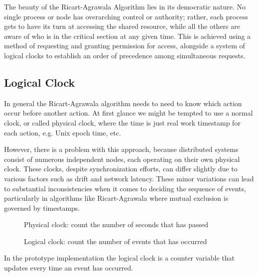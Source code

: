 The beauty of the Ricart-Agrawala Algorithm lies in its democratic nature. No 
single process or node has overarching control or authority; rather, each process 
gets to have its turn at accessing the shared resource, while all the others are 
aware of who is in the critical section at any given time. This is achieved using 
a method of requesting and granting permission for access, alongside a system of 
logical clocks to establish an order of precedence among simultaneous requests.

\subsection{Logical Clock}
In general the Ricart-Agrawala algorithm needs to need to know which action occur 
before another action. At first glance we might be tempted to use a normal clock, 
or called physical clock, where the time is just real work timestamp for each action, 
e.g. Unix epoch time, etc.

However, there is a problem with this approach, because 
distributed systems consist of numerous independent nodes, each operating on their 
own physical clock. These clocks, despite synchronization efforts, can differ 
slightly due to various factors such as drift and network latency. These minor 
variations can lead to substantial inconsistencies when it comes to deciding the 
sequence of events, particularly in algorithms like Ricart-Agrawala where mutual 
exclusion is governed by timestamps.

\begin{figure}[H]
  \centering
  
  \caption{Physical clock: count the number of seconds that has passed}
  \label{fig:physical_clock}
\end{figure}

\begin{figure}[H]
  \centering
  
  \caption{Logical clock: count the number of events that has occurred}
  \label{fig:logical_clock}
\end{figure}


In the prototype implementation the logical clock is a counter variable that updates
every time an event has occurred.

